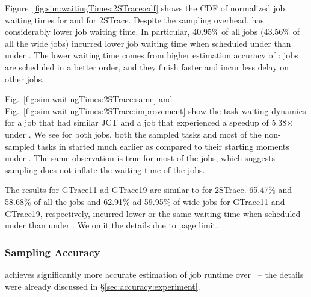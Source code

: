 
Figure~\ref{fig:sim:waitingTimes:2STrace:cdf} shows the CDF of
normalized job waiting times for \slearn and \primarybasepredict for
2STrace.  Despite the sampling overhead, \slearn has considerably
lower job waiting time.  In particular, 40.95\% 
  of all jobs (43.56\%
of all the wide jobs) incurred lower job waiting time when scheduled
under \slearn than under \primarybasepredict.  The lower waiting time
comes from higher estimation accuracy of \slearn: jobs are scheduled
in a better order, and they finish faster and incur less delay on
other jobs.

Fig.~\ref{fig:sim:waitingTimes:2STrace:same} and
Fig.~\ref{fig:sim:waitingTimes:2STrace:improvement} show the task waiting
dynamics for a job that had similar JCT and a job that experienced a speedup of
5.38$\times$ under \slearn.  We see for both jobs, both the sampled tasks and
most of the non-sampled tasks in \slearn started much earlier as compared to
their starting moments under \primarybasepredict.  The same observation is true
for most of the jobs, which suggests sampling does not inflate the waiting time
of the jobs.

{The results for GTrace11 ad GTrace19 are similar to for 2STrace.
  65.47\% and 58.68\% of all the jobs and 62.91\% ad
  59.95\% of wide
    jobs for GTrace11 and GTrace19, respectively,
    incurred lower or the same waiting time when scheduled under
    \slearn than under \primarybasepredict. We omit the details due to
    page limit.
}

  \subsubsection{Sampling Accuracy}
\label{sec:sim:accuracy}

\slearn achieves significantly more accurate estimation of job runtime over 
\primarybasepredict\ --
the details were already discussed in \S\ref{sec:accuracy:experiment}.

